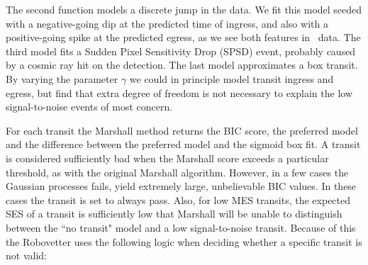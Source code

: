 The second function models a discrete jump in the data. We fit this model seeded with a negative-going dip at the predicted time of ingress, and also with a positive-going spike at the predicted egress, as we see both features in \Kepler\ data. The third model fits a Sudden Pixel Sensitivity Drop (SPSD) event, probably caused by a cosmic ray hit on the detection. The last model approximates a box transit. By varying the parameter $\gamma$ we could in principle model transit ingress and egress, but find that extra degree of freedom is not necessary to explain the low signal-to-noise events of most concern.

For each transit the Marshall method returns the BIC score, the preferred model and the difference between the preferred model and the sigmoid box fit.  A transit is considered sufficiently bad when the Marshall score exceeds a particular threshold, as with the original Marshall algorithm.  However, in a few cases the Gaussian processes fails, yield extremely large, unbelievable BIC values. In these cases the transit is set to always pass.  Also, for low MES transits, the expected SES of a transit is sufficiently low that Marshall will be unable to distinguish between the ``no transit" model and a low signal-to-noise transit.  Because of this the Robovetter uses the following logic when deciding whether a specific transit is not valid:





